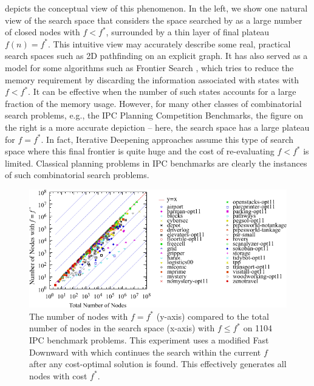  depicts the conceptual view of this phenomenon.
% 
In the left, we show 
one natural  %
view of the search space that considers the space searched by \astar as
a large number of closed nodes with $f<f^*$, surrounded by
a thin layer of final plateau $f(n)=f^*$.  This intuitive view
may accurately describe some real, practical search spaces such as 2D pathfinding on an explicit
graph.
% 
It has also served as a model for some algorithms such as Frontier Search \cite{korf1999divide,korf2000divide},
which tries to reduce the memory requirement by discarding the information associated with states with $f<f^*$.
It can be effective when the number of such states accounts for a large fraction of the memory usage.
% 
However, for many other classes of combinatorial search problems, e.g., the IPC Planning Competition Benchmarks, 
the figure on the right is a more accurate depiction -- here, the  search space has a large plateau for $f=f^*$.
In fact, Iterative Deepening approaches \cite{korf1985depth} assume this type of search space
where this final frontier is quite huge and the cost of re-evaluating $f<f^*$ is limited.
Classical planning problems in IPC benchmarks are clearly the instances of such combinatorial search problems.

\begin{figure}[htbp]
  \centering
  \includegraphics[width=\linewidth]{tables/aaai16-frontier/aaai16prelim3/lmcut_frontier_noh-front.pdf}
 \caption{
 The number of nodes with $f=f^*$ (y-axis) compared to the
 total number of nodes in the search space (x-axis) with $f\leq f^*$ on 1104 IPC benchmark problems.
 This experiment uses a modified Fast Downward with \lmcut which 
 continues the search within the current $f$ after any cost-optimal solution is found.
 This effectively generates all nodes with cost $f^*$.
  }
 \label{fig:plateau-noh}
\end{figure}

